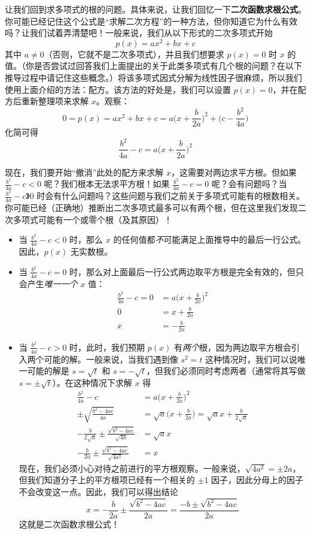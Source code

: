 让我们回到求多项式的根的问题。具体来说，让我们回忆一下\textbf{二次函数求根公式}。你可能已经记住这个公式是“求解二次方程”的一种方法，但你知道它为什么有效吗？让我们试着弄清楚吧！一般来说，我们从以下形式的二次多项式开始
\[p(x) = ax^2 + bx + c\]
其中 $a \ne 0$（否则，它就不是二次多项式），并且我们想要求 $p(x) = 0$ 时 $x$ 的值。（你是否尝试过回答我们上面提出的关于此类多项式有几个根的问题？在以下推导过程中请记住这些概念。）将该多项式因式分解为线性因子很麻烦，所以我们使用上面介绍的方法：配方。该方法的好处是，我们可以设置 $p(x)=0$，并在配方后重新整理项来求解 $x$。观察：
\[0 = p(x) = ax^2 + bx + c =a\Big(x+\frac{b}{2a}\Big)^2+\Big(c- \frac{b^2}{4a}\Big)\]
化简可得
\[\frac{b^2}{4a} -c = a\Big(x+\frac{b}{2a}\Big)^2\]

现在，我们要开始“撤消”此处的配方来求解 $x$，这需要对两边求平方根。但如果 $\frac{b^2}{4a} -c < 0$ 呢？我们根本无法求平方根！如果 $\frac{b^2}{4a} -c = 0$ 呢？会有问题吗？当 $\frac{b^2}{4a} -c 》 0$ 时会有什么问题吗？这些问题与我们之前关于多项式可能有的根数相关。你可能已经（正确地）推断出二次多项式最多可以有两个根，但在这里我们发现二次多项式可能有一个或零个根（及其原因）！

\begin{itemize}
    \item 当 $\frac{b^2}{4a} -c < 0$ 时，那么 $x$ 的任何值都\textit{不}可能满足上面推导中的最后一行公式。因此，$p(x)$ 无实数根。
    \item 当 $\frac{b^2}{4a} -c = 0$ 时，那么对上面最后一行公式两边取平方根是完全有效的，但只会产生\textit{唯一一个 }$x$ 值：
    \begin{align*}
        \frac{b^2}{4a} -c = 0 &= a\Big(x+\frac{b}{2a}\Big)^2 \\
        0 &= x+\frac{b}{2a} \\
        x &= -\frac{b}{2a}
    \end{align*}
    \item 当 $\frac{b^2}{4a} -c > 0$ 时，此时，我们预期 $p(x)$ 有\textit{两个}根，因为两边取平方根会引入两个可能的解。一般来说，当我们遇到像 $s^2 = t$ 这种情况时，我们可以说唯一可能的解是 $s =\sqrt{t}$ 和 $s = -\sqrt{t}$，但我们必须同时考虑两者（通常将其写做 $s = \pm\sqrt{t}$）。在这种情况下求解 $x$ 得
    \begin{align*}
        \frac{b^2}{4a} -c &= a\Big(x+\frac{b}{2a}\Big)^2 \\
        \pm\sqrt{\frac{b^2-4ac}{4a}} &= \sqrt{a}\Big(x+\frac{b}{2a}\Big) = \sqrt{a}x+\frac{b}{2\sqrt{a}} \\
        -\frac{b}{2\sqrt{a}}\pm\frac{\sqrt{b^2-4ac}}{\sqrt{4a}} &= \sqrt{a}x \\
        -\frac{b}{2a}\pm\frac{\sqrt{b^2-4ac}}{\sqrt{4a^2}} &= x
    \end{align*}
    现在，我们必须小心对待之前进行的平方根观察。一般来说，$\sqrt{4a^2} = \pm2a$，但我们知道分子上的平方根项已经有一个相关的 $\pm1$ 因子，因此分母上的因子不会改变这一点。因此，我们可以得出结论
    \[x = -\frac{b}{2a}\pm\frac{\sqrt{b^2-4ac}}{2a} = \frac{-b\pm\sqrt{b^2-4ac}}{2a}\]
    这就是二次函数求根公式！
\end{itemize}

